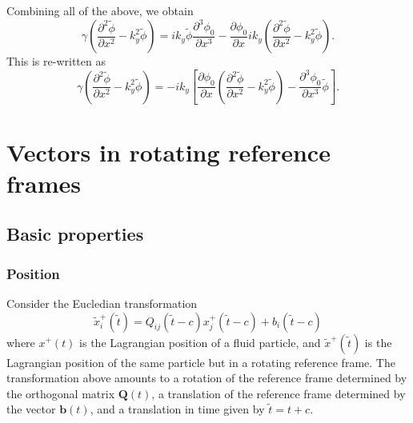 \documentclass[oneside,a4paper,11pt]{report}
\begin{document}
Combining all of the above, we obtain
\begin{equation}
    \gamma \left ( \frac{\partial^2 \tilde{\phi}}{\partial x^2} - k_y^2 \tilde{\phi} \right ) = ik_y \tilde{\phi} \frac{\partial^3 \phi_0}{\partial x^3} - \frac{\partial \phi_0}{\partial x} i k_y \left ( \frac{\partial^2 \tilde{\phi}}{\partial x^2} - k_y^2 \tilde{\phi} \right ).
\end{equation}
This is re-written as 
\begin{equation}
    \gamma \left ( \frac{\partial^2 \tilde{\phi}}{\partial x^2} - k_y^2 \tilde{\phi} \right ) = -i k_y \left [ \frac{\partial \phi_0}{\partial x} \left ( \frac{\partial^2 \tilde{\phi}}{\partial x^2} - k_y^2 \tilde{\phi} \right ) - \frac{\partial^3 \phi_0}{\partial x^3} \tilde{\phi} \right ].
\end{equation}

\appendix

\chapter{Vectors in rotating reference frames}

\section{Basic properties}

\subsection{Position}
Consider the Eucledian transformation
\begin{equation}
\label{eq:x_rot}
\tilde{x}^+_i(\tilde{t}) = Q_{ij}(\tilde{t}-c) x^+_j(\tilde{t}-c) + b_i(\tilde{t}-c) 
\end{equation}
where $x^+(t)$ is the Lagrangian position of a fluid particle, and $\tilde{x}^+(\tilde{t})$ is the Lagrangian position of the same particle but in a rotating reference frame. The transformation above amounts to a rotation of the reference frame determined by the orthogonal matrix $\mathbf{Q}(t)$, a translation of the reference frame determined by the vector $\mathbf{b}(t)$, and a translation in time given by $\tilde{t} = t + c$. 
\end{document}
